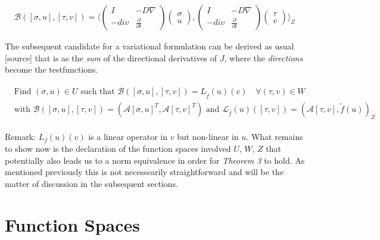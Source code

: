 \documentclass[../draft_1.tex]{subfiles}
\begin{document}
\begin{ceqn}
	\begin{equation}
	\begin{aligned}
	\mathcal{B} ([\sigma, u], [\tau, v]) = \langle \begin{pmatrix} 
	I & - D \nabla \\
	-div & \frac{\partial}{\partial t}
	\end{pmatrix} 
	\begin{pmatrix}
	\sigma \\
	u
	\end{pmatrix}, 
	\begin{pmatrix}
	I & - D \nabla \\
	-div & \frac{\partial}{\partial t}
	\end{pmatrix}
	\begin{pmatrix}
	\tau \\
	v
	\end{pmatrix} \rangle_Z
	\end{aligned}
	\end{equation}
\end{ceqn}
The subsequent candidate for a variational formulation can be derived as usual [source] that is as the \textit{sum} of the directional derivatives of $J$, where the \textit{directions} become the testfunctions.

\begin{ceqn}
	\begin{align}
	\begin{aligned}
	\text{ Find } (\sigma, u) \in U \text{ such that } \mathcal{B} ([\sigma, u], [\tau, v]) = L_{\tilde{f}}(u)(v) \quad \forall (\tau, v) \in W \\
 \text{ with } \mathcal{B} ([\sigma, u], [\tau, v]) = (\mathcal{A} [\sigma, u]^T,  \mathcal{A} [\tau, v]^T) \text{ and } \mathcal{L}_{\tilde{f}}(u)([\tau,v]) = (\mathcal{A}[\tau,v], \tilde{f}(u))_Z
\end{aligned}
	\end{align}
\end{ceqn}
Remark: $L_f(u)(v)$ is a linear operator in $v$ but non-linear in $u$. 
What remains to show now is the declaration of the function spaces involved $U$, $W$, $Z$ that potentially also leads us to a norm equivalence in order for \textit{Theorem 3} to hold. As mentioned previously this is not necessearily straightforward and will be the matter of discussion in the subsequent sections. 

\section{Function Spaces}
\end{document}
